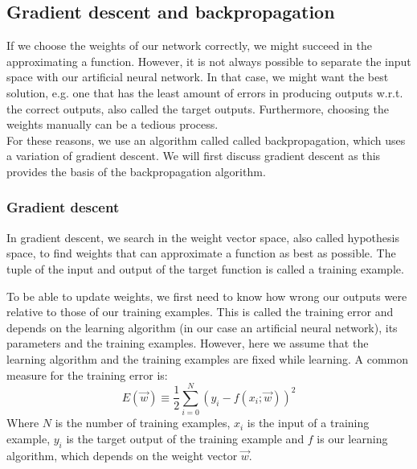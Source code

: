 \subsection{Gradient descent and backpropagation} %
\label{sub:gradient_descent_and_backpropagation}
If we choose the weights of our network correctly, we might succeed in the approximating a function.
However, it is not always possible to separate the input space with our artificial neural network. In that case, we might want the best solution, e.g. one that has the least amount of errors in producing outputs w.r.t. the correct outputs, also called the target outputs. Furthermore, choosing the weights manually can be a tedious process.\\
For these reasons, we use an algorithm called called backpropagation, which uses a variation of gradient descent. We will first discuss gradient descent as this provides the basis of the backpropagation algorithm.

\subsubsection{Gradient descent} %
\label{ssub:gradient_descent}
In gradient descent, we search in the weight vector space, also called hypothesis space, to find weights that can approximate a function as best as possible. The tuple of the input and output of the target function is called a training example.

To be able to update weights, we first need to know how wrong our outputs were relative to those of our training examples.
This is called the training error and depends on the learning algorithm (in our case an artificial neural network), its parameters and the training examples. However, here we assume that the learning algorithm and the training examples are fixed while learning.
A common measure for the training error is:
\begin{equation}
    E(\overrightarrow{w}) \equiv \frac{1}{2} \sum_{i=0}^N (y_i - f(x_i;\overrightarrow{w}))^2
\end{equation}
Where $N$ is the number of training examples, $x_i$ is the input of a training example, $y_i$ is the target output of the training example and $f$ is our learning algorithm, which depends on the weight vector $\overrightarrow{w}$.

